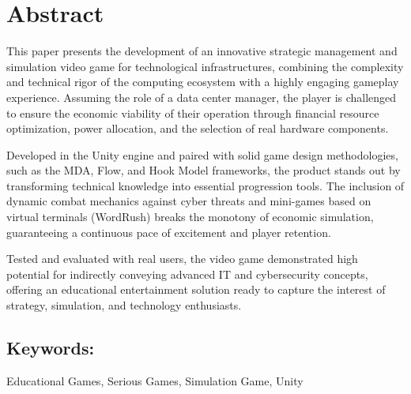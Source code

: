 \chapter{Abstract}
\label{chap:abstract}

This paper presents the development of an innovative strategic management and simulation video game for technological infrastructures, combining the complexity and technical rigor of the computing ecosystem with a highly engaging gameplay experience. Assuming the role of a data center manager, the player is challenged to ensure the economic viability of their operation through financial resource optimization, power allocation, and the selection of real hardware components.

Developed in the Unity engine and paired with solid game design methodologies, such as the \ac{MDA}, Flow, and Hook Model frameworks, the product stands out by transforming technical knowledge into essential progression tools. The inclusion of dynamic combat mechanics against cyber threats and mini-games based on virtual terminals (WordRush) breaks the monotony of economic simulation, guaranteeing a continuous pace of excitement and player retention.

Tested and evaluated with real users, the video game demonstrated high potential for indirectly conveying advanced \ac{IT} and cybersecurity concepts, offering an educational entertainment solution ready to capture the interest of strategy, simulation, and technology enthusiasts.

\section*{Keywords:}
Educational Games, Serious Games, Simulation Game, Unity